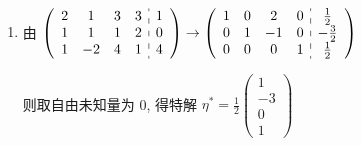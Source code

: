      \paragraph{} %
         \begin{enumerate}
             \item %
                   由 \( \left(\begin{array}{cccc:c}
                           2 & 1  & 3 & 3 & 1 \\
                           1 & 1  & 1 & 2 & 0 \\
                           1 & -2 & 4 & 1 & 4
                       \end{array}\right) \rightarrow \left(\begin{array}{cccc:c}
                           1 & 0 & 2  & 0 & \frac{1}{2}  \\
                           0 & 1 & -1 & 0 & -\frac{3}{2} \\
                           0 & 0 & 0  & 1 & \frac{1}{2}
                       \end{array}\right) \)

                   则取自由未知量为 0, 得特解 \( \eta^{*} = \frac{1}{2}\begin{pmatrix}
                       1  \\
                       -3 \\
                       0  \\
                       1
                   \end{pmatrix} \)


\end{enumerate}
